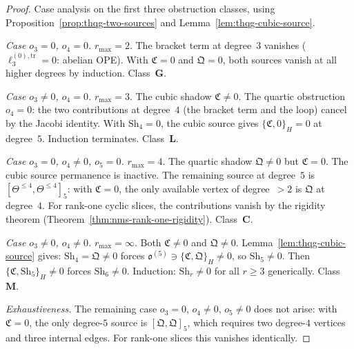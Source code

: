 \begin{proof}
Case analysis on the first three obstruction classes, using
Proposition~\ref{prop:thqg-two-sources} and
Lemma~\ref{lem:thqg-cubic-source}.

\smallskip
\noindent\emph{Case $o_3 = 0$, $o_4 = 0$.}
$r_{\max} = 2$. The bracket term at degree~$3$ vanishes
($\ell_3^{(0),\mathrm{tr}} = 0$: abelian OPE).
With $\mathfrak{C} = 0$ and $\mathfrak{Q} = 0$, both
sources vanish at all higher degrees by induction.
Class~$\mathbf{G}$.

\smallskip
\noindent\emph{Case $o_3 \neq 0$, $o_4 = 0$.}
$r_{\max} = 3$. The cubic shadow $\mathfrak{C} \neq 0$.
The quartic obstruction $o_4 = 0$: the two contributions
at degree~$4$ (the bracket term and the loop) cancel by
the Jacobi identity. With $\mathrm{Sh}_4 = 0$, the cubic
source gives $\{\mathfrak{C}, 0\}_H = 0$ at degree~$5$.
Induction terminates. Class~$\mathbf{L}$.

\smallskip
\noindent\emph{Case $o_3 = 0$, $o_4 \neq 0$, $o_5 = 0$.}
$r_{\max} = 4$. The quartic shadow $\mathfrak{Q} \neq 0$
but $\mathfrak{C} = 0$. The cubic source permanence is
inactive. The remaining source at degree~$5$ is
$[\Theta^{\leq 4}, \Theta^{\leq 4}]_5$: with
$\mathfrak{C} = 0$, the only available vertex of
degree~$> 2$ is $\mathfrak{Q}$ at degree~$4$. For
rank-one cyclic slices, the contributions vanish by the
rigidity theorem (Theorem~\ref{thm:nms-rank-one-rigidity}).
Class~$\mathbf{C}$.

\smallskip
\noindent\emph{Case $o_3 \neq 0$, $o_4 \neq 0$.}
$r_{\max} = \infty$. Both $\mathfrak{C} \neq 0$ and
$\mathfrak{Q} \neq 0$.
Lemma~\ref{lem:thqg-cubic-source} gives:
$\mathrm{Sh}_4 = \mathfrak{Q} \neq 0$ forces
$\mathfrak{o}^{(5)} \ni \{\mathfrak{C}, \mathfrak{Q}\}_H
\neq 0$, so $\mathrm{Sh}_5 \neq 0$. Then
$\{\mathfrak{C}, \mathrm{Sh}_5\}_H \neq 0$ forces
$\mathrm{Sh}_6 \neq 0$. Induction: $\mathrm{Sh}_r \neq 0$
for all $r \geq 3$ generically. Class~$\mathbf{M}$.

\smallskip
\noindent\emph{Exhaustiveness.}
The remaining case $o_3 = 0$, $o_4 \neq 0$, $o_5 \neq 0$
does not arise: with $\mathfrak{C} = 0$, the only degree-$5$
source is $[\mathfrak{Q}, \mathfrak{Q}]_5$, which requires
two degree-$4$ vertices and three internal edges. For
rank-one slices this vanishes identically.
\end{proof}



